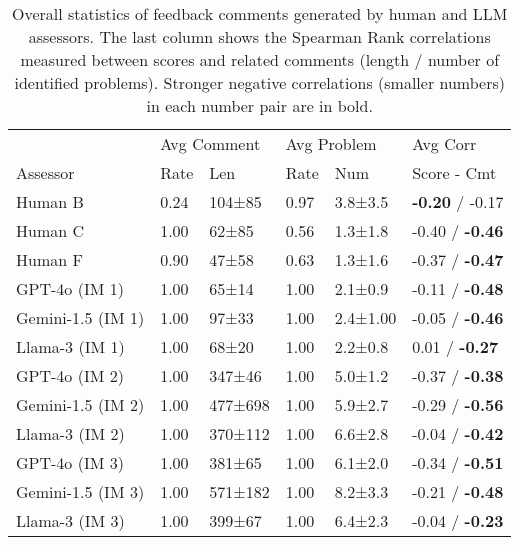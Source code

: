 \begin{table}[]
    \centering
    \setlength{\tabcolsep}{5pt}
    \scriptsize

\begin{tabular}{llllll}
\toprule
                  &    \multicolumn{2}{l}{Avg Comment} & \multicolumn{2}{l}{Avg Problem} & Avg Corr \\
         Assessor &    Rate &             Len &    Rate &             Num & Score - Cmt \\
\midrule
          Human B &  0.24 &  104{\tiny±85} &  0.97 & 3.8{\tiny±3.5} & \textbf{-0.20} / -0.17 \\
          Human C &  1.00 &   62{\tiny±85} &  0.56 & 1.3{\tiny±1.8} & -0.40 /     \textbf{-0.46} \\
          Human F &  0.90 &   47{\tiny±58} &  0.63 & 1.3{\tiny±1.6} & -0.37 /     \textbf{-0.47} \\ \midrule
          
          GPT-4o (IM 1) & 1.00 &   65{\tiny±14} & 1.00 & 2.1{\tiny±0.9} & -0.11 /      \textbf{-0.48} \\
          Gemini-1.5 (IM 1) & 1.00 &   97{\tiny±33} & 1.00 & 2.4{\tiny±1.00} & -0.05 /      \textbf{-0.46} \\
          Llama-3 (IM 1) & 1.00 &   68{\tiny±20} & 1.00 & 2.2{\tiny±0.8} &  0.01 /     \textbf{-0.27} \\ \midrule

          GPT-4o (IM 2) & 1.00 &  347{\tiny±46} & 1.00 & 5.0{\tiny±1.2} & -0.37 /     \textbf{-0.38} \\
          Gemini-1.5 (IM 2) & 1.00 & 477{\tiny±698} & 1.00 & 5.9{\tiny±2.7} & -0.29 /      \textbf{-0.56} \\
          Llama-3 (IM 2) & 1.00 & 370{\tiny±112} & 1.00 & 6.6{\tiny±2.8} & -0.04 /     \textbf{-0.42} \\ \midrule
          
          GPT-4o (IM 3) & 1.00 &  381{\tiny±65} & 1.00 & 6.1{\tiny±2.0} & -0.34 /      \textbf{-0.51} \\
          Gemini-1.5 (IM 3) & 1.00 & 571{\tiny±182} & 1.00 & 8.2{\tiny±3.3} & -0.21 /      \textbf{-0.48} \\
          Llama-3 (IM 3) & 1.00 &  399{\tiny±67} & 1.00 & 6.4{\tiny±2.3} & -0.04 /    \textbf{-0.23} \\
\bottomrule
\end{tabular}
    
    \caption{Overall statistics of feedback comments generated by human and LLM assessors. The last column shows the Spearman Rank correlations measured between scores and related comments (length / number of identified problems). Stronger negative correlations (smaller numbers) in each number pair are in bold.}
    \label{tab:overallCommentStats}
\end{table}


